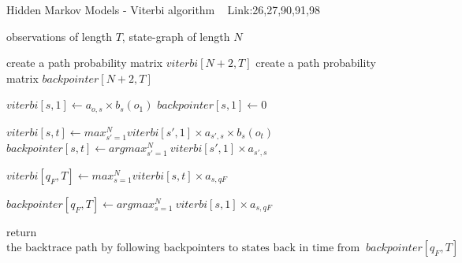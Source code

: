 \documentclass[a4paper]{article}
\begin{document}
\begin{algorithm}
   \caption{ Hidden Markov Models - Viterbi algorithm ~\cite{ jurafsky_martin_2008} Link:26,27,90,91,98
    }
   
   
  \begin{algorithmic}[1]
  
   \INPUT 
   \Statex  observations of length $T$, state-graph of length $N$
   
     
     \State create a path probability matrix $viterbi[N+2,T]$
      \State create a path probability matrix $backpointer[N+2,T]$
  
   \State $viterbi[s,1] \leftarrow a_{o,s} \times b_{s}(o_{1})$
   \State $backpointer[s,1] \leftarrow 0$
   
   
   \EndFor
   
   \State $viterbi[s,t] \leftarrow  max_{s'=1}^N viterbi[s',1] \times a_{s',s} \times b_{s} (o_{t}) $
   \State $backpointer[s,t] \leftarrow argmax_{s'=1}^N \ viterbi[s',1] \times a_{s',s} $
   
   \EndFor
   
   \EndFor
   
    \State $viterbi[q_{F},T]  \leftarrow  max_{s=1}^N viterbi[s,t] \times a_{s,qF}   $
    
   \State $backpointer[q_{F},T] \leftarrow argmax_{s=1}^N \ viterbi[s,1] \times a_{s,qF} $
   
   \State  return $\text{the backtrace path by following backpointers to states back in time from } \ backpointer[q_{F},T]$
  
    \end{algorithmic}

\end{algorithm}
\end{document}
